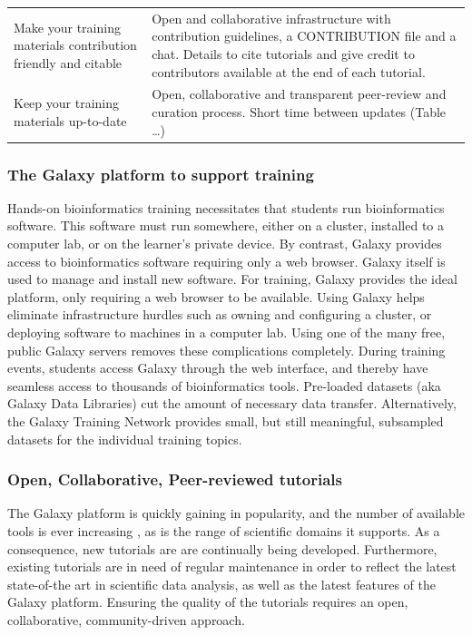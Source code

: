 \documentclass[10pt,letterpaper]{article}
\begin{document}
\begin{table}[h!]
\begin{tabular}{p{}p{}}
		Make your training materials contribution friendly and citable                & Open and collaborative infrastructure with contribution guidelines, a CONTRIBUTION file and a chat. Details to cite tutorials and give credit to contributors available at the end of each tutorial.\\
		Keep your training materials up-to-date                                       & Open, collaborative and transparent peer-review and curation process. Short time between updates (Table …)\\
	\end{tabular}
\end{table}


\subsubsection*{The Galaxy platform to support training}
Hands-on bioinformatics training necessitates that students run bioinformatics software.
This software must run somewhere, either on a cluster, installed to a computer lab, or on the learner's private device.
By contrast, Galaxy provides access to bioinformatics software requiring only a web browser.
Galaxy itself is used to manage and install new software. For training, Galaxy provides the ideal platform, only requiring a web browser to be available. %
Using Galaxy helps eliminate infrastructure hurdles such as owning and configuring a cluster, or deploying software to machines in a computer lab. Using one of the many free, public Galaxy servers removes these complications completely.
During training events, students access Galaxy through the web interface, and thereby have seamless access to thousands of bioinformatics tools.
Pre-loaded datasets (aka Galaxy Data Libraries) cut the amount of necessary data transfer.
Alternatively, the Galaxy Training Network provides small, but still meaningful, subsampled datasets for the individual training topics.


\subsubsection*{Open, Collaborative, Peer-reviewed tutorials}
The Galaxy platform is quickly gaining in popularity, and the number of available tools is ever increasing \cite{TODO}, as is the range of scientific domains it supports. As a consequence, new tutorials are are continually being developed. %
Furthermore, existing tutorials are in need of regular maintenance in order to reflect the latest state-of-the art in scientific data analysis, as well as the latest features of the Galaxy platform. Ensuring the quality of the tutorials requires an open, collaborative, community-driven approach.
\end{document}
